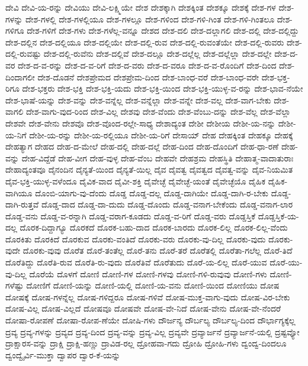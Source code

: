 {ದೇವಿ
ದೇವಿ-ಯ-ರನ್ನು
ದೇವಿಯು
ದೇವಿ-ಲಕ್ಷ್ಮಿಯೇ
ದೇಶ
ದೇಶಕ್ಕಾಗಿ
ದೇಶಕ್ಕಿಂತ
ದೇಶಕ್ಕೂ
ದೇಶಕ್ಕೆ
ದೇಶ-ಗಳ
ದೇಶ-ಗಳನ್ನು
ದೇಶ-ಗಳಲ್ಲಿ
ದೇಶ-ಗಳಲ್ಲಿಯೂ
ದೇಶ-ಗಳಲ್ಲೂ
ದೇಶ-ಗಳಿಂದ
ದೇಶ-ಗಳಿ-ಗಿಂತ
ದೇಶ-ಗಳಿ-ಗಿಂತಲೂ
ದೇಶ-ಗಳಿಗೂ
ದೇಶ-ಗಳಿಗೆ
ದೇಶ-ಗಳು
ದೇಶ-ಗಳೆಲ್ಲ-ವನ್ನೂ
ದೇಶದ
ದೇಶ-ದಲಿ
ದೇಶ-ದಲ್ಲಾಗಲಿ
ದೇಶ-ದಲ್ಲಿ
ದೇಶ-ದಲ್ಲಿದ್ದು
ದೇಶ-ದಲ್ಲಿನ
ದೇಶ-ದಲ್ಲಿಯೂ
ದೇಶ-ದಲ್ಲಿಯೇ
ದೇಶ-ದಲ್ಲಿ-ರುವ
ದೇಶ-ದಲ್ಲಿ-ರುವಂತೆಯೇ
ದೇಶ-ದಲ್ಲಿ-ರುವರು
ದೇಶ-ದಲ್ಲಿ-ರುವಷ್ಟು
ದೇಶ-ದಲ್ಲಿ-ರುವೆನು
ದೇಶ-ದಲ್ಲಿವೆ
ದೇಶ-ದಲ್ಲೂ
ದೇಶ-ದಲ್ಲೆಲ್ಲ
ದೇಶ-ದಲ್ಲೆಲ್ಲಾ
ದೇಶ-ದಲ್ಲೇ
ದೇಶ-ದ-ವರ
ದೇಶ-ದ-ವ-ರನ್ನು
ದೇಶ-ದ-ವ-ರಿಗೆ
ದೇಶ-ದ-ವರು
ದೇಶ-ದ-ವರೂ
ದೇಶ-ದ-ವ-ರೊಂದಿಗೆ
ದೇಶ-ದಿಂದ
ದೇಶ-ದಿಂದಾಗಲೀ
ದೇಶ-ದೊಡನೆ
ದೇಶಪ್ರೇಮದ
ದೇಶಪ್ರೇಮ-ದಿಂದ
ದೇಶ-ಬಾಂಧ-ವರೆ
ದೇಶ-ಬಾಂಧ-ವರೇ
ದೇಶ-ಭಕ್ತ-ರಿಗೂ
ದೇಶ-ಭಕ್ತರು
ದೇಶ-ಭಕ್ತಿ
ದೇಶ-ಭಕ್ತಿ-ಯದು
ದೇಶ-ಭಕ್ತಿ-ಯಿಂದ
ದೇಶ-ಭಕ್ತಿ-ಯುಳ್ಳ-ವ-ರನ್ನು
ದೇಶ-ಭಾವ-ನೆಯೇ
ದೇಶ-ಭಾಷೆ-ಯನ್ನು
ದೇಶ-ವನ್ನು
ದೇಶ-ವನ್ನೆಲ್ಲ
ದೇಶ-ವನ್ನೆಲ್ಲಾ
ದೇಶ-ವನ್ನೇ
ದೇಶ-ವಲ್ಲ
ದೇಶ-ವಾಗ-ಬೇಕು
ದೇಶ-ವಾಗಲಿ
ದೇಶ-ವಾಗು-ವುದ-ರಿಂದ
ದೇಶ-ವಿಲ್ಲ
ದೇಶವು
ದೇಶ-ವೆಂದು
ದೇಶ-ವೆಂಬು-ದನ್ನು
ದೇಶ-ವೆಲ್ಲ
ದೇಶ-ವೆಲ್ಲಾ
ದೇಶವೇ
ದೇಶ-ವೇನು
ದೇಶವೊ
ದೇಶ-ವೊಂದ-ರಲ್ಲೇ-ಸಾಧ್ಯ
ದೇಶಾದ್ಯಂತ
ದೇಶೀ
ದೇಶೀಯ
ದೇಶೀ-ಯ-ನನ್ನು
ದೇಶೀ-ಯ-ನಿಗೆ
ದೇಶೀ-ಯ-ರನ್ನು
ದೇಶೀ-ಯ-ರಲ್ಲಿಯೂ
ದೇಶೀ-ಯ-ರಿಗೆ
ದೇಸಾಯ್
ದೇಹ
ದೇಹಕ್ಕಿಂತ
ದೇಹಕ್ಕೂ
ದೇಹಕ್ಕೆ
ದೇಹತ್ಯಾಗ
ದೇಹದ
ದೇಹ-ದ-ಮೇಲೆ
ದೇಹ-ದಲ್ಲಿ
ದೇಹ-ದಲ್ಲೆ
ದೇಹ-ದಿಂದ
ದೇಹ-ದೊಂದಿಗೆ
ದೇಹ-ಧಾ-ರಣೆ
ದೇಹ-ವನ್ನು
ದೇಹ-ವಿದ್ದೆಡೆ
ದೇಹ-ವೀಗ
ದೇಹ-ವುಳ್ಳ
ದೇಹ-ವೆಂಬ
ದೇಹವೇ
ದೇಹಶ್ರಮ
ದೇಹಸ್ಥಿತಿ
ದೇಹಾತ್ಮ-ವಾದಾತುರಾಃ
ದೇಹಾದ್ಯಂತವೂ
ದೈನಂದಿನ
ದೈನ್ಯತೆ-ಯಿಂದ
ದೈನ್ಯತೆ-ಯಿಲ್ಲ
ದೈವ
ದೈವತ್ವ
ದೈವತ್ವದ
ದೈವತ್ವ-ವನ್ನು
ದೈವ-ನಿಯಮಿತ
ದೈವ-ಭಕ್ತಿ-ಯುಳ್ಳ-ವಳೆಂದೂ
ದೈವಿಕ-ವಾದ
ದೈವೀ-ಶಕ್ತಿ
ದೈವೇಚ್ಛೆ
ದೈವೇಚ್ಛೆ-ಯಂತೆ
ದೈವೇಚ್ಛೆಯೊ
ದೈಹಿಕ
ದೈಹಿಕ-ವಾಗಿಯೂ
ದೊಂಬಿ-ಯಾಗು-ವು-ದೆಂದು
ದೊಡ್ಡ
ದೊಡ್ಡ-ದಲ್ಲ
ದೊಡ್ಡ-ದಾಗಿಯೇ
ದೊಡ್ಡ-ದಾಗಿ-ರ-ಬೇಕು
ದೊಡ್ಡ-ದಾಗಿ-ರುತ್ತವೆ
ದೊಡ್ಡ-ದಾದ
ದೊಡ್ಡ-ದಾ-ದುದು
ದೊಡ್ಡ-ದೊಂದು
ದೊಡ್ಡ-ವನಾಗ-ಬೇಕೆಂದು
ದೊಡ್ಡ-ವನಾಗ-ಲಾರ
ದೊಡ್ಡ-ವನು
ದೊಡ್ಡ-ವ-ರನ್ನಾಗಿ
ದೊಡ್ಡ-ವರಾಗ-ಕೂಡದು
ದೊಡ್ಡ-ವ-ರಿಗೆ
ದೊಡ್ಡ-ವರು
ದೊಡ್ಡಸ್ತಿಕೆ
ದೊಡ್ಡಸ್ತಿಕೆ-ಯ-ದಲ್ಲ
ದೊರಕ-ದಿದ್ದಾಗ್ಯೂ
ದೊರಕದೆ
ದೊರಕ-ಬಹು-ದಾದ
ದೊರಕ-ಬಾರದು
ದೊರಕ-ಲಿಲ್ಲ
ದೊರಕ-ಲಿಲ್ಲ-ವೆಂದು
ದೊರಕಿತು
ದೊರಕಿದೆ
ದೊರಕುವ
ದೊರಕು-ವಂತಿದೆ
ದೊರಕು-ವರು
ದೊರಕು-ವು-ದಿಲ್ಲ
ದೊರಕು-ವುದು
ದೊರಕು-ವುದೇ
ದೊರಕು-ವುವು
ದೊರೆತ
ದೊರೆ-ತಂತೆಲ್ಲ
ದೊರೆ-ತನು
ದೊರೆ-ತರೆ
ದೊರೆತಲ್ಲಿ
ದೊರೆತಾ-ಗಲೆಲ್ಲ
ದೊರೆ-ತಿದೆ
ದೊರೆತಿದ್ದು
ದೊರೆತಿ-ರುವ
ದೊರೆತಿ-ರು-ವುದು
ದೊರೆತಿವೆ
ದೊರೆತುದು
ದೊರೆ-ಯ-ಲಿಲ್ಲ
ದೊರೆ-ಯುವ
ದೊರೆ-ಯು-ವು-ದಿಲ್ಲ
ದೊರೆಯೆ
ದೊಳಗೆ
ದೋಣಿ
ದೋಣಿ-ಗಳ
ದೋಣಿ-ಗಳವು
ದೋಣಿ-ಗಳಿ-ರುವುವು
ದೋಣಿ-ಗಳು
ದೋಣಿ-ಗಳೆಷ್ಟು
ದೋಣಿಗೆ
ದೋಣಿ-ಯನ್ನು
ದೋಣಿ-ಯಲ್ಲಿ
ದೋಣಿ-ಯ-ವನು
ದೋಣಿ-ಯಿಂದ
ದೋಣಿಯು
ದೋಷ
ದೋಷಕ್ಕೆ
ದೋಷ-ಗಳನ್ನೆಲ್ಲ
ದೋಷ-ಗಳಿದ್ದರೂ
ದೋಷ-ಗಳಿವೆ
ದೋಷ-ಮುಕ್ತ-ವಾಗು-ವುದು
ದೋಷ-ವಿರ-ಬೇಕು
ದೋಷ-ವಿಲ್ಲ
ದೋಷ-ವಿಲ್ಲದೆ
ದೋಷವೂ
ದೋಷವೇ
ದೋಷ-ವೇ-ನಿದೆ
ದೋಷ-ವೇನು
ದೋಷ-ವೇ-ನೆಂದರೆ
ದೋಷಾ-ರೋಪಣೆ
ದೋಷಾ-ರೋಪ-ಣೆಯೇ
ದೋಷಿ-ಗಳು
ದೌರ್ಜನ್ಯ
ದೌರ್ಬಲ್ಯ
ದೌರ್ಬಲ್ಯ-ದಿಂದ
ದೌರ್ಭಾಗ್ಯಕ್ಕೆಲ್ಲ
ದ್ರವ್ಯ
ದ್ರವ್ಯ-ಗಳನ್ನು
ದ್ರವ್ಯದ
ದ್ರವ್ಯ-ದಿಂದ
ದ್ರವ್ಯ-ವನ್ನು
ದ್ರವ್ಯ-ವಿಲ್ಲ
ದ್ರವ್ಯವೇ
ದ್ರವ್ಯಾರ್ಜನೆ
ದ್ರವ್ಯಾರ್ಜನೆ-ಯಲ್ಲಿ
ದ್ರಷ್ಟವ್ಯೋ
ದ್ರಾಕ್ಷಾರಸ-ವನ್ನು
ದ್ರಾಕ್ಷಿ
ದ್ರಾಕ್ಷಿ-ಹಣ್ಣು
ದ್ರಾವಿಡ-ರಲ್ಲ
ದ್ರೋಹವಾ-ಗದು
ದ್ರೋಹಿ
ದ್ರೋಹಿ-ಗಳು
ದ್ವಂದ್ವ-ದಿಂದಲೂ
ದ್ವಂದ್ವೈರ್ವಿ-ಮುಕ್ತಾ
ದ್ವಾಪರ
ದ್ವಾರ-ಕೆ-ಯನ್ನು
}
